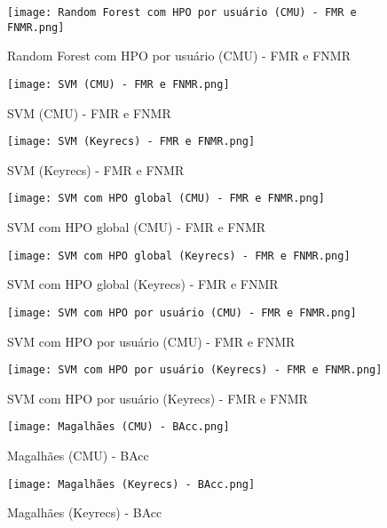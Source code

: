 \begin{figure}[H]
    \caption{Random Forest com HPO por usuário (CMU) - FMR e FNMR}
    \label{fig:Random Forest com HPO por usuário (CMU) - FMR e FNMR}
    \centering
    \texttt{[image: Random Forest com HPO por usuário (CMU) - FMR e FNMR.png]}
\end{figure}
\begin{figure}[H]
    \caption{SVM (CMU) - FMR e FNMR}
    \label{fig:SVM (CMU) - FMR e FNMR}
    \centering
    \texttt{[image: SVM (CMU) - FMR e FNMR.png]}
\end{figure}
\begin{figure}[H]
    \caption{SVM (Keyrecs) - FMR e FNMR}
    \label{fig:SVM (Keyrecs) - FMR e FNMR}
    \centering
    \texttt{[image: SVM (Keyrecs) - FMR e FNMR.png]}
\end{figure}
\begin{figure}[H]
    \caption{SVM com HPO global (CMU) - FMR e FNMR}
    \label{fig:SVM com HPO global (CMU) - FMR e FNMR}
    \centering
    \texttt{[image: SVM com HPO global (CMU) - FMR e FNMR.png]}
\end{figure}
\begin{figure}[H]
    \caption{SVM com HPO global (Keyrecs) - FMR e FNMR}
    \label{fig:SVM com HPO global (Keyrecs) - FMR e FNMR}
    \centering
    \texttt{[image: SVM com HPO global (Keyrecs) - FMR e FNMR.png]}
\end{figure}
\begin{figure}[H]
    \caption{SVM com HPO por usuário (CMU) - FMR e FNMR}
    \label{fig:SVM com HPO por usuário (CMU) - FMR e FNMR}
    \centering
    \texttt{[image: SVM com HPO por usuário (CMU) - FMR e FNMR.png]}
\end{figure}
\begin{figure}[H]
    \caption{SVM com HPO por usuário (Keyrecs) - FMR e FNMR}
    \label{fig:SVM com HPO por usuário (Keyrecs) - FMR e FNMR}
    \centering
    \texttt{[image: SVM com HPO por usuário (Keyrecs) - FMR e FNMR.png]}
\end{figure}
\begin{figure}[H]
    \caption{Magalhães (CMU) - BAcc}
    \label{fig:Magalhães (CMU) - BAcc}
    \centering
    \texttt{[image: Magalhães (CMU) - BAcc.png]}
\end{figure}
\begin{figure}[H]
    \caption{Magalhães (Keyrecs) - BAcc}
    \label{fig:Magalhães (Keyrecs) - BAcc}
    \centering
    \texttt{[image: Magalhães (Keyrecs) - BAcc.png]}
\end{figure}
